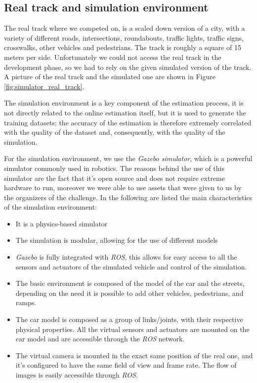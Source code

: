 \documentclass[a4paper,12pt,sort&compress]{article}
\begin{document}
\subsection{Real track and simulation environment}
    The real track where we competed on, is a scaled down version of a city, with a variety of
    different roads, intersections, roundabouts, traffic lights, traffic signs, crosswalks, other
    vehicles and pedestrians. The track is roughly a square of 15 meters per side. Unfortunately we
    could not access the real track in the development phase, so we had to rely on the given
    simulated version of the track. A picture of the real track and the simulated one are shown in
    Figure \ref*{fig:simulator_real_track}.

    The simulation environment is a key component of the estimation process, it
    is not directly related to the online estimation itself, but it is used to
    generate the training datasets; the accuracy of the estimation is therefore
    extremely correlated with the quality of the dataset and, consequently, with
    the quality of the simulation. 

    For the simulation environment, we use the \textit{Gazebo
    simulator}\citep*{1389727}, which is a powerful simulator commonly used in
    robotics. The reasons behind the use of this simulator are the fact that
    it's open source and does not require extreme hardware to run, moreover we
    were able to use assets that were given to us by the organizers of the
    challenge. In the following are listed the main characteristics of the
    simulation environment:
    \begin{itemize}
        \item It is a physics-based simulator
        \item The simulation is modular, allowing for the use of different
        models 
        \item \textit{Gazebo} is fully integrated with \textit{ROS}, this allows
        for easy access to all the sensors and actuators of the simulated
        vehicle and control of the simulation.
        \item The basic environment is composed of the model of the car and the
        streets, depending on the need it is possible to add other vehicles,
        pedestrians, and ramps.
        \item The car model is composed as a group of links/joints, with their
        respective physical properties. All the virtual sensors and actuators are
        mounted on the car model and are accessible through the \textit{ROS} network.
        \item The virtual camera is mounted in the exact same position of the
        real one, and it's configured to have the same field of view and frame
        rate. The flow of images is easily accessible through \textit{ROS}.
    \end{itemize}
\end{document}
